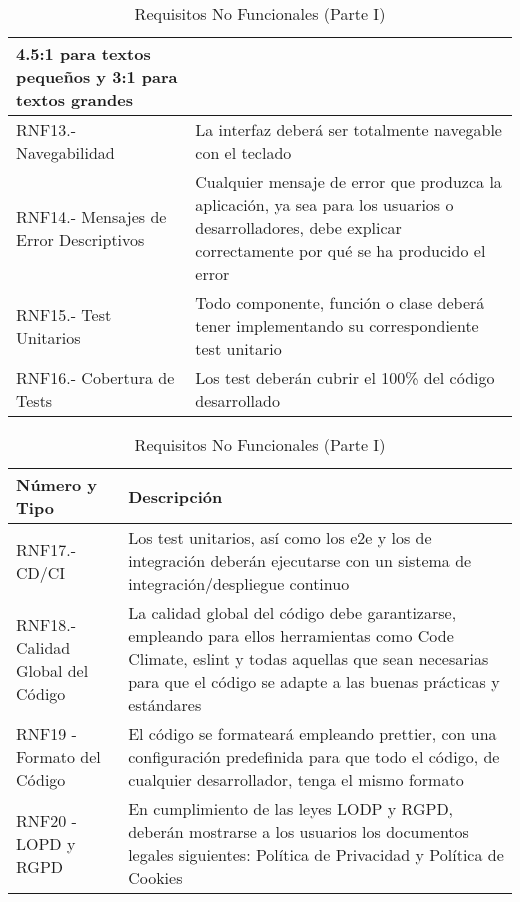 \begin{appendices}
\begin{table}[H]
\begin{center}
\begin{tabular}{| p{5cm} | p{10cm} |}
			4.5:1 para textos pequeños y 3:1 para textos grandes\\ \hline
			RNF13.- Navegabilidad &  La interfaz deberá ser totalmente navegable con el teclado\\ \hline
			RNF14.- Mensajes de Error Descriptivos &  Cualquier mensaje de error que produzca la aplicación, ya sea para los usuarios o desarrolladores, debe explicar correctamente por qué se ha producido el error\\ \hline
			RNF15.- Test Unitarios & Todo componente, función o clase deberá tener implementando su correspondiente test unitario \\ \hline
			RNF16.- Cobertura de Tests &  Los test deberán cubrir el 100\% del código desarrollado\\ \hline
		\end{tabular}	
		\egroup
		\caption{Requisitos No Funcionales (Parte I)}
		\end{center}
\end{table}

\begin{table}[H]
	\begin{center}
		\bgroup
		\def\arraystretch{1.5}
		\begin{tabular}{| p{5cm} | p{10cm} |}
			\hline
			\textbf{Número y Tipo} & \textbf{Descripción}  \\ \hline
			RNF17.- CD/CI &  Los test unitarios, así como los e2e y los de integración deberán ejecutarse con
			un sistema de integración/despliegue continuo\\ \hline
			RNF18.- Calidad Global del Código &  La calidad global del código debe garantizarse, empleando
			para ellos herramientas como Code Climate, eslint y todas aquellas que sean necesarias para que
			el código se adapte a las buenas prácticas y estándares\\ \hline
			RNF19 - Formato del Código & El código se formateará empleando prettier, con una configuración
			predefinida para que todo el código, de cualquier desarrollador, tenga el mismo formato \\ \hline
			RNF20 - LOPD y RGPD & En cumplimiento de las leyes LODP y RGPD, deberán mostrarse a los
			usuarios los documentos legales siguientes: Política de Privacidad y Política de Cookies \\ \hline
		\end{tabular}	
		\egroup
		\caption{Requisitos No Funcionales (Parte I)}
	\end{center}
\end{table}

\end{appendices}

\newpage

\printglossary	

\newpage




